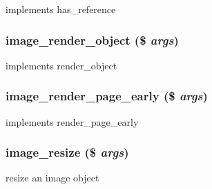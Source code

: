 implements has\_\-reference \hypertarget{module__image_8inc_8php_4fadded2a225d1b5ea73404a84597620}{
\subsubsection[{image\_\-render\_\-object}]{\setlength{\rightskip}{0pt plus 5cm}image\_\-render\_\-object (\$ {\em args})}}
\label{module__image_8inc_8php_4fadded2a225d1b5ea73404a84597620}


implements render\_\-object \hypertarget{module__image_8inc_8php_8266a74a11a86a73e2aa3709388fd43f}{
\subsubsection[{image\_\-render\_\-page\_\-early}]{\setlength{\rightskip}{0pt plus 5cm}image\_\-render\_\-page\_\-early (\$ {\em args})}}
\label{module__image_8inc_8php_8266a74a11a86a73e2aa3709388fd43f}


implements render\_\-page\_\-early \hypertarget{module__image_8inc_8php_9e03a71310133176236ae0bd4a0241e0}{
\subsubsection[{image\_\-resize}]{\setlength{\rightskip}{0pt plus 5cm}image\_\-resize (\$ {\em args})}}
\label{module__image_8inc_8php_9e03a71310133176236ae0bd4a0241e0}


resize an image object

